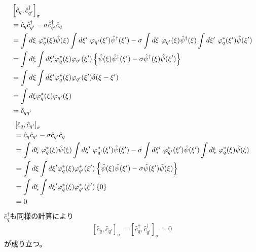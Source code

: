 \documentclass[dvipdfmx, 11pt, a4paper]{jsarticle}
\numberwithin{equation}{section}
\theoremstyle{definition}
\begin{document}
    \begin{derivationBox}
        \begin{align}
            &\left[ \hat{c}_q,\hat{c}_{q'}^\dagger \right]_\sigma \notag \\
            &= \hat{c}_q \hat{c}_{q'}^\dagger - \sigma \hat{c}_{q'}^\dagger \hat{c}_q \notag \\
            &= \int d\xi\ \varphi_q^*(\xi) \hat{\psi}(\xi) \int d\xi'\ \varphi_{q'}(\xi') \hat{\psi}^\dagger(\xi')  - \sigma \int d\xi\ \varphi_{q'}(\xi) \hat{\psi}^\dagger(\xi) \int d\xi'\ \varphi_q^*(\xi') \hat{\psi}(\xi') \notag \\
            &= \int d\xi \int d\xi' \varphi_q^*(\xi) \varphi_{q'}(\xi') \left\{ \hat{\psi}(\xi)\hat{\psi}^\dagger(\xi')  - \sigma \hat{\psi}^\dagger(\xi) \hat{\psi}(\xi') \right\} \notag \\
            &= \int d\xi \int d\xi' \varphi_q^*(\xi) \varphi_{q'}(\xi') \delta(\xi - \xi') \notag \\
            &= \int d\xi \varphi_q^*(\xi) \varphi_{q'}(\xi) \notag \\
            &= \delta_{qq'}
        \end{align}
        \begin{align}
            &\left[ \hat{c}_q, \hat{c}_{q'}\right]_\sigma \notag \\
            &= \hat{c}_q \hat{c}_{q'} - \sigma \hat{c}_{q'} \hat{c}_q \notag \\
            &= \int d\xi\ \varphi_q^*(\xi) \hat{\psi}(\xi) \int d\xi'\ \varphi_{q'}^*(\xi') \hat{\psi}(\xi') - \sigma \int d\xi'\ \varphi_{q'}^*(\xi') \hat{\psi}(\xi')  \int d\xi\ \varphi_q^*(\xi) \hat{\psi}(\xi) \notag \\
            &= \int d\xi \int d\xi' \varphi_q^*(\xi) \varphi_{q'}^*(\xi') \left\{ \hat{\psi}(\xi)\hat{\psi}(\xi') - \sigma  \hat{\psi}(\xi') \hat{\psi}(\xi) \right\} \notag \\
            &= \int d\xi \int d\xi' \varphi_q^*(\xi) \varphi_{q'}^*(\xi') \left\{ 0 \right\} \notag \notag \\
            &= 0 \notag 
        \end{align}
        $\hat{c}^\dagger_q$も同様の計算により
        \begin{align}
            \left[ \hat{c}_q, \hat{c}_{q'}\right]_\sigma = \left[ \hat{c}_q^\dagger, \hat{c}_{q'}^\dagger\right]_\sigma = 0
        \end{align}
        が成り立つ。\\
        \begin{align}

\end{align}
\end{derivationBox}
\end{document}
